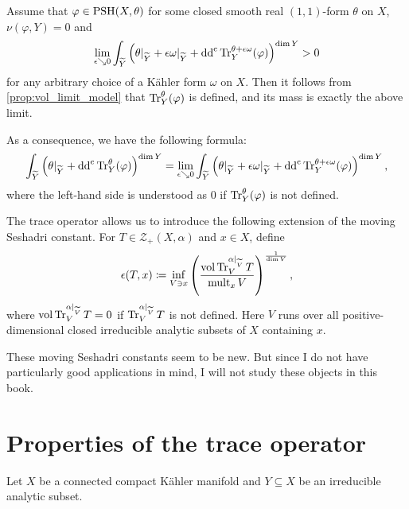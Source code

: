 \begin{example}\label{ex:tracedefinedposmass}
    Assume that $\varphi\in \mathrm{PSH}(X,\theta)$ for some closed smooth real $(1,1)$-form $\theta$ on $X$, $\nu(\varphi,Y)=0$ and
    \begin{equation}\label{eq:traceposmasscond}
    \lim_{\epsilon\searrow 0} \int_{\widetilde{Y}} \left( \theta|_{\widetilde{Y}} +\epsilon\omega|_{\widetilde{Y}}+\mathrm{dd}^{\mathrm{c}}\operatorname{Tr}_Y^{\theta+\epsilon\omega}(\varphi)\right)^{\dim Y} >0
    \end{equation}
    for any arbitrary choice of a Kähler form $\omega$ on $X$.
    Then it follows from \cref{prop:vol_limit_model} that $\operatorname{Tr}_Y^{\theta}(\varphi)$ is defined, and its mass is exactly the above limit.

    As a consequence, we have the following formula:
    \begin{equation}
        \int_{\widetilde{Y}} \left(\theta|_{\widetilde{Y}}+\mathrm{dd}^{\mathrm{c}}\operatorname{Tr}_Y^{\theta}(\varphi)\right)^{\dim Y}=\lim_{\epsilon\searrow 0} \int_{\widetilde{Y}} \left( \theta|_{\widetilde{Y}} +\epsilon\omega|_{\widetilde{Y}}+\mathrm{dd}^{\mathrm{c}}\operatorname{Tr}_Y^{\theta+\epsilon\omega}(\varphi)\right)^{\dim Y},
    \end{equation}
    where the left-hand side is understood as $0$ if $\operatorname{Tr}_Y^{\theta}(\varphi)$ is not defined.
\end{example}

\begin{remark}\label{rmk:movingSes}
    The trace operator allows us to introduce the following extension of the moving Seshadri constant. For $T\in \mathcal{Z}_+(X,\alpha)$ and $x\in X$, define
    \[
    \epsilon(T,x)\coloneqq \inf_{V\ni x}\left(\frac{\operatorname{vol} \operatorname{Tr}_V^{\alpha|_{\widetilde{V}}} T}{\operatorname{mult}_x V} \right)^{\frac{1}{\dim V}},
    \]
    where $\operatorname{vol} \operatorname{Tr}_V^{\alpha|_{\widetilde{V}}} T=0$ if $\operatorname{Tr}_V^{\alpha|_{\widetilde{V}}} T$ is not defined. Here $V$ runs over all positive-dimensional closed irreducible analytic subsets of $X$ containing $x$.

    These moving Seshadri constants seem to be new. But since I do not have particularly good applications in mind, I will not study these objects in this book.
\end{remark}

\section{Properties of the trace operator}\label{sec:proptrace}
Let $X$ be a connected compact Kähler manifold and $Y\subseteq X$ be an irreducible analytic subset.

